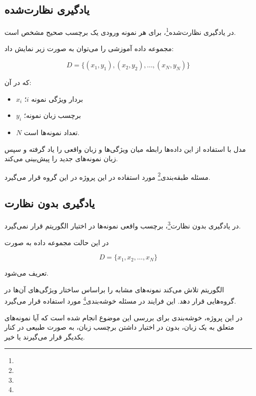 \subsection{یادگیری نظارت‌شده}

در یادگیری نظارت‌شده\footnote{}، برای هر نمونه ورودی یک برچسب صحیح مشخص است.

مجموعه داده آموزشی را می‌توان به صورت زیر نمایش داد:

\begin{equation}
D=
\{(x_1,y_1),(x_2,y_2),\ldots,(x_N,y_N)\}
\end{equation}

که در آن:

\begin{itemize}
	\item $x_i$ بردار ویژگی نمونه $i$؛
	\item $y_i$ برچسب زبان نمونه؛
	\item $N$ تعداد نمونه‌ها است.
\end{itemize}

مدل با استفاده از این داده‌ها رابطه میان ویژگی‌ها و زبان واقعی را یاد گرفته و سپس زبان نمونه‌های جدید را پیش‌بینی می‌کند.

مسئله طبقه‌بندی\footnote{} مورد استفاده در این پروژه در این گروه قرار می‌گیرد.


\subsection{یادگیری بدون نظارت}

در یادگیری بدون نظارت\footnote{}، برچسب واقعی نمونه‌ها در اختیار الگوریتم قرار نمی‌گیرد.

در این حالت مجموعه داده به صورت

\begin{equation}
D=\{x_1,x_2,\ldots,x_N\}
\end{equation}

تعریف می‌شود.

الگوریتم تلاش می‌کند نمونه‌های مشابه را براساس ساختار ویژگی‌های آن‌ها در گروه‌هایی قرار دهد. این فرایند در مسئله خوشه‌بندی\footnote{} مورد استفاده قرار می‌گیرد.

در این پروژه، خوشه‌بندی برای بررسی این موضوع انجام شده است که آیا نمونه‌های متعلق به یک زبان، بدون در اختیار داشتن برچسب زبان، به صورت طبیعی در کنار یکدیگر قرار می‌گیرند یا خیر.


